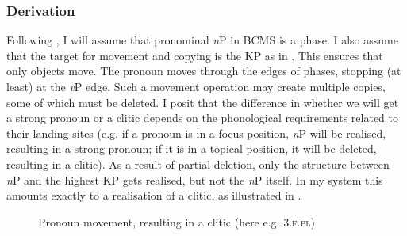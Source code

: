 \documentclass[output=paper,colorlinks,citecolor=brown]{langscibook}
\begin{document}
\subsubsection{Derivation}

Following \citet{vanurkpronouns}, I will assume that pronominal \textit{n}P in BCMS is a phase. I also assume that the target for movement and copying is the KP as in . This ensures that only objects move. The pronoun moves through the edges of phases, stopping (at least) at the \textit{v}P edge.
Such a movement operation may create multiple copies, some of which must be deleted. I posit that the difference in whether we will get a strong pronoun or a clitic depends on the phonological requirements related to their landing sites (e.g. if a pronoun is in a focus position, \textit{n}P will be realised, resulting in a strong pronoun; if it is in a topical position, it will be deleted, resulting in a clitic).
As a result of partial deletion, only the structure between \textit{n}P and the highest KP gets realised, but not the \textit{n}P itself. In my system this amounts exactly to a realisation of a clitic, as illustrated in . 

\begin{figure}
    \caption{Pronoun movement, resulting in a clitic (here e.g. \textsc{3.f.pl})}
    \label{fig:derivpronmovement}
\end{figure}
\end{document}
